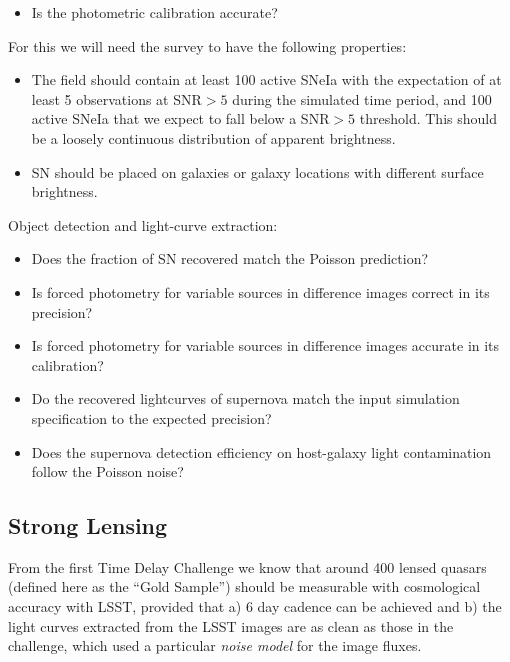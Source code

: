 \begin{itemize}
\item Is the photometric calibration accurate?
\end{itemize}

For this we will need the \TwinklesOne survey to have the following
properties:
\begin{itemize}
\item The field should contain at least 100 active SNeIa with the expectation of at least 5 observations at SNR$>5$ during the simulated time period, and 100 active SNeIa that we expect to fall below a SNR$>5$ threshold.  This should be a loosely continuous distribution of apparent brightness.
\item SN should be placed on galaxies or galaxy locations with different surface brightness.
\end{itemize}

Object detection and light-curve extraction:
\begin{itemize}
\item Does the fraction of SN recovered match the Poisson prediction?
\item Is forced photometry for variable sources in difference images correct in its precision?
\item Is forced photometry for variable sources in difference images accurate in its calibration?
\item Do the recovered lightcurves of supernova match the input simulation specification to the expected precision?
\item Does the supernova detection efficiency on host-galaxy light contamination follow the Poisson noise?
\end{itemize}






\subsection{Strong Lensing}
\label{sec:twinkles1:science:stronglensing}

From the first Time Delay Challenge we know that around 400 lensed
quasars (defined here as the ``Gold Sample'') should be measurable
with cosmological accuracy with LSST, provided that a) 6 day cadence
can be achieved and b) the light curves extracted from the LSST images
are as clean as those in the challenge, which used a particular {\it noise
model} for the image fluxes.

